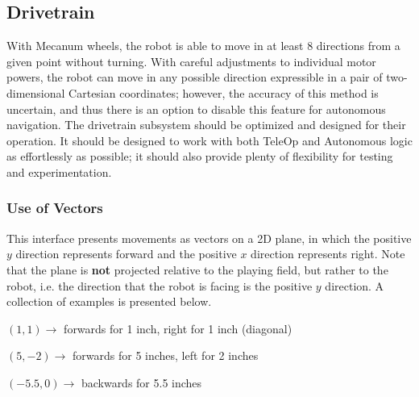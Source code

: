 \documentclass[letterpaper]{article}
\begin{document}
\subsection{Drivetrain}
With Mecanum wheels, the robot is able to move in at least 8 directions from a given point without turning. With careful adjustments to individual motor powers, the robot can move in any possible direction expressible in a pair of two-dimensional Cartesian coordinates; however, the accuracy of this method is uncertain, and thus there is an option to disable this feature for autonomous navigation. The drivetrain subsystem should be optimized and designed for their operation. It should be designed to work with both TeleOp and Autonomous logic as effortlessly as possible; it should also provide plenty of flexibility for testing and experimentation.

\subsubsection{Use of Vectors}
This interface presents movements as vectors on a 2D plane, in which the positive $y$ direction represents forward and the positive $x$ direction represents right. Note that the plane is \textbf{not} projected relative to the playing field, but rather to the robot, i.e. the direction that the robot is facing is the positive $y$ direction. A collection of examples is presented below.
\begin{center}
	$(1, 1) \rightarrow$ forwards for 1 inch, right for 1 inch (diagonal)
	
	$(5, -2) \rightarrow$ forwards for 5 inches, left for 2 inches
	
	$(-5.5, 0) \rightarrow$ backwards for 5.5 inches
\end{center}
\end{document}
